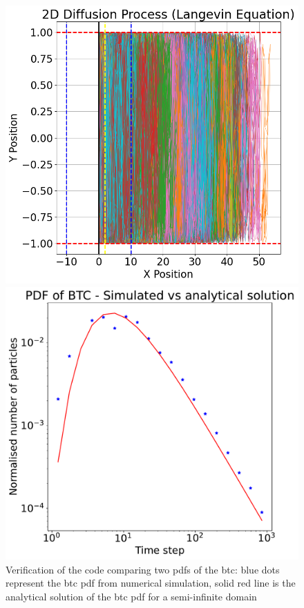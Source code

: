 \documentclass{cup-ino}
\begin{document}
\begin{figure}[bt!]
\begin{minipage}{0.47\textwidth}
\includegraphics[width=\linewidth]{images/trajectoriesSemiInfinite.png}
\end{minipage}
\hfill
\begin{minipage}{0.47\textwidth}
\includegraphics[width=\linewidth]{images/verificationSemi-infinite.pdf}
\end{minipage}
\caption{Verification of the code comparing two pdfs of the btc: blue dots represent the btc pdf from numerical simulation, solid red line is the analytical solution of the btc pdf for a semi-infinite domain}
\label{fig:twosubs}
\end{figure}
\end{document}
